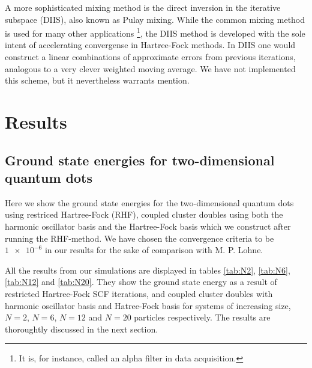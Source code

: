 \documentclass[
    a4paper, aps, twocolumn, floatfix, superscriptaddress,
    nofootinbib]{revtex4-1}
\newcommand{\1}{\mathds{1}}
\begin{document}
        A more sophisticated mixing method is the direct inversion 
        in the iterative subspace (DIIS), also known as Pulay mixing. While the
        common mixing method is used for many other applications
        \footnote{It is, for instance, called an alpha filter in data acquisition.},
        the DIIS method is developed with the sole intent of accelerating
        convergense in Hartree-Fock methods. In DIIS one would construct a
        linear combinations of approximate errors from previous iterations,
        analogous to a very clever weighted moving average. We have not implemented
        this scheme, but it nevertheless warrants mention.

\section{Results}

    \subsection{Ground state energies for two-dimensional quantum dots}
        Here we show the ground state energies for the two-dimensional quantum
        dots using restriced Hartree-Fock (RHF), coupled cluster doubles using
        both the harmonic oscillator basis and the Hartree-Fock basis which we
        construct after running the RHF-method. We have chosen the convergence
        criteria to be $\num{1e-6}$ in our results for the sake of comparison
        with M. P. Lohne\cite{lohne2011ab}.

        All the results from our simulations are displayed in tables \ref{tab:N2},
        \ref{tab:N6}, \ref{tab:N12} and \ref{tab:N20}. They show the ground state
        energy as a result of restricted Hartree-Fock SCF iterations, and coupled
        cluster doubles with harmonic oscillator basis and Hatree-Fock basis for 
        systems of increasing size, $N=2$, $N=6$, $N=12$ and $N=20$ particles
        respectively. The results are thoroughtly discussed in the next section.
\end{document}
